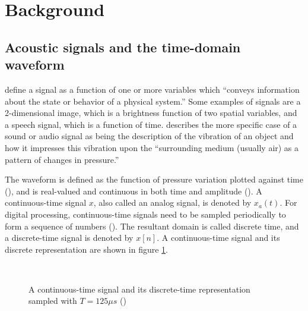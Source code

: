 \documentclass[report.tex]{subfiles}
\begin{document}
\section{Background}
\label{sec:background}

\subsection{Acoustic signals and the time-domain waveform}
\label{sec:timedomain}

\textcite[Chapter~2]{discretebook} define a signal as a function of one or more variables which ``conveys information about the state or behavior of a physical system.'' Some examples of signals are a 2-dimensional image, which is a brightness function of two spatial variables, and a speech signal, which is a function of time. \textcite[Chapter~2]{moore} describes the more specific case of a sound or audio signal as being the description of the vibration of an object and how it impresses this vibration upon the ``surrounding medium (usually air) as a pattern of changes in pressure.''

The waveform is defined as the function of pressure variation plotted against time (\cite{moore, melbook}), and is real-valued and continuous in both time and amplitude (\cite[Chapter~2]{melbook}). A continuous-time signal $x$, also called an analog signal, is denoted by $x_{a}(t)$. For digital processing, continuous-time signals need to be sampled periodically to form a sequence of numbers (\cite[Chapter~2]{discretebook}). The resultant domain is called discrete time, and a discrete-time signal is denoted by $x[n]$.  A continuous-time signal and its discrete representation are shown in figure \ref{fig:discretecontinuous}.

\begin{figure}[ht]
	\centering
	\\
	\caption{A continuous-time signal and its discrete-time representation sampled with $T = 125\mu s$ (\cite[Chapter~2]{discretebook})}
	\label{fig:discretecontinuous}
\end{figure}
\end{document}
